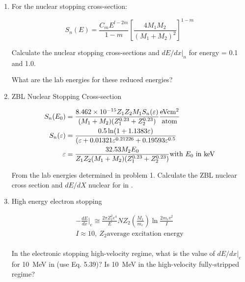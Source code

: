 
\DeclareSIUnit{}



\begin{enumerate}
  \item For the nuclear stopping cross-section:

    \begin{equation*}
      S_n(E) = \frac{C_mE^{l-2m}}{1-m}\left[\frac{4 M_1 M_2}{(M_1 +
      M_2)^2}\right]^{1 - m}
    \end{equation*}

    Calculate the nuclear stopping cross-sections and $dE/dx|_n$ for
    energy = 0.1 and 1.0.  \par

    What are the lab energies for these reduced energies? \par

  \item ZBL Nuclear Stopping Cross-section

    \begin{align*}
      S_n(E_0) &= \frac{\num{8.462e-15} Z_1Z_2M_1S_n(\varepsilon)}
      {(M_1 + M_2)(Z_1^{0.23} + Z_2^{0.23})}
      \si{\frac{\electronvolt\centi\meter\squared}{atom}} \\
      S_n(\varepsilon) &= \frac{0.5 \ln(1 + 1.1383\varepsilon)}
      {(\varepsilon + 0.01321\varepsilon^{0.21226}
        + 0.19593\varepsilon^{0.5}} \\
        \varepsilon &= \frac{32.53 M_2 E_0}{Z_1Z_2(M_1 +
        M_2)(Z_1^{0.23} + Z_2^{0.23})}
        \text{with $E_0$ in \si{\kilo\electronvolt}}
      \end{align*}

      From the lab energies determined in problem 1. Calculate the
      ZBL nuclear cross section and $dE/dX$ nuclear for  in . \par

    \item High energy electron stopping

      \begin{align*}
        - \frac{dE}{dx} \Biggr|_e \cong \frac{2\pi
        Z_1^2e^4}{E}NZ_2\left(\frac{M_1}{m_e}\right)\ln\frac{2m_ev^2}{I} \\
        I \approx 10,\ Z_2 \text{average excitation energy} \\
      \end{align*}

      In the electronic stopping high-velocity regime, what is the
      value of $dE/dx|_e$ for \SI{10}{\mega\electronvolt}  in 
      (use Eq. 5.39)?  Is \SI{10}{\mega\electronvolt}  in the
      high-velocity fully-stripped regime? \par


\end{enumerate}
